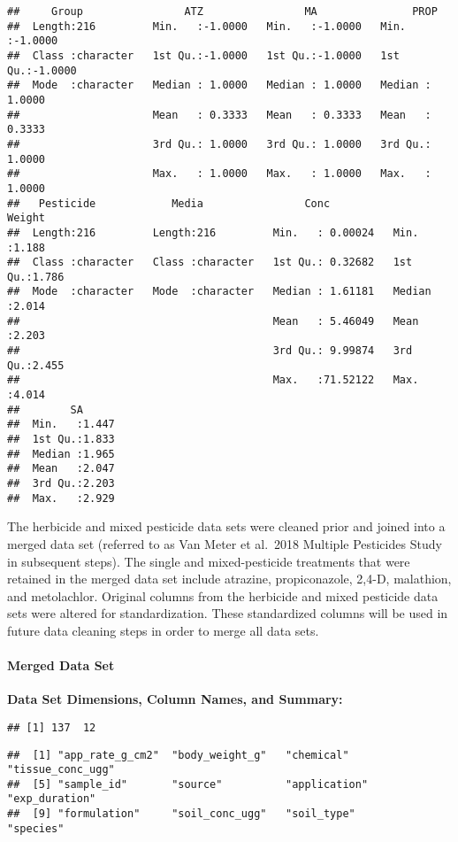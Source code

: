 \documentclass[
]{article}
\begin{document}
\begin{verbatim}
##     Group                ATZ                MA               PROP        
##  Length:216         Min.   :-1.0000   Min.   :-1.0000   Min.   :-1.0000  
##  Class :character   1st Qu.:-1.0000   1st Qu.:-1.0000   1st Qu.:-1.0000  
##  Mode  :character   Median : 1.0000   Median : 1.0000   Median : 1.0000  
##                     Mean   : 0.3333   Mean   : 0.3333   Mean   : 0.3333  
##                     3rd Qu.: 1.0000   3rd Qu.: 1.0000   3rd Qu.: 1.0000  
##                     Max.   : 1.0000   Max.   : 1.0000   Max.   : 1.0000  
##   Pesticide            Media                Conc              Weight     
##  Length:216         Length:216         Min.   : 0.00024   Min.   :1.188  
##  Class :character   Class :character   1st Qu.: 0.32682   1st Qu.:1.786  
##  Mode  :character   Mode  :character   Median : 1.61181   Median :2.014  
##                                        Mean   : 5.46049   Mean   :2.203  
##                                        3rd Qu.: 9.99874   3rd Qu.:2.455  
##                                        Max.   :71.52122   Max.   :4.014  
##        SA       
##  Min.   :1.447  
##  1st Qu.:1.833  
##  Median :1.965  
##  Mean   :2.047  
##  3rd Qu.:2.203  
##  Max.   :2.929
\end{verbatim}

The herbicide and mixed pesticide data sets were cleaned prior and
joined into a merged data set (referred to as Van Meter et al.~2018
Multiple Pesticides Study in subsequent steps). The single and
mixed-pesticide treatments that were retained in the merged data set
include atrazine, propiconazole, 2,4-D, malathion, and metolachlor.
Original columns from the herbicide and mixed pesticide data sets were
altered for standardization. These standardized columns will be used in
future data cleaning steps in order to merge all data sets.

\hypertarget{merged-data-set}{%
\paragraph{\texorpdfstring{\textbf{Merged Data
Set}}{Merged Data Set}}\label{merged-data-set}}

\textbf{Data Set Dimensions, Column Names, and Summary:}

\begin{verbatim}
## [1] 137  12
\end{verbatim}

\begin{verbatim}
##  [1] "app_rate_g_cm2"  "body_weight_g"   "chemical"        "tissue_conc_ugg"
##  [5] "sample_id"       "source"          "application"     "exp_duration"   
##  [9] "formulation"     "soil_conc_ugg"   "soil_type"       "species"
\end{verbatim}
\end{document}
